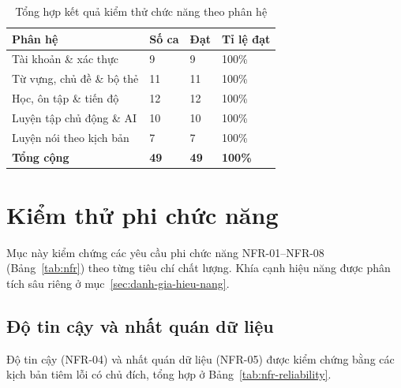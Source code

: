 \begin{table}[h]
  \centering
  \small
  \renewcommand{\arraystretch}{1.3}
  \begin{tabular}{|p{5.0cm}|p{2.4cm}|p{2.2cm}|p{3.0cm}|}
    \hline
    \textbf{Phân hệ} & \textbf{Số ca} & \textbf{Đạt} & \textbf{Tỉ lệ đạt} \\
    \hline
    Tài khoản \& xác thực & 9 & 9 & 100\% \\
    \hline
    Từ vựng, chủ đề \& bộ thẻ & 11 & 11 & 100\% \\
    \hline
    Học, ôn tập \& tiến độ & 12 & 12 & 100\% \\
    \hline
    Luyện tập chủ động \& AI & 10 & 10 & 100\% \\
    \hline
    Luyện nói theo kịch bản & 7 & 7 & 100\% \\
    \hline
    \textbf{Tổng cộng} & \textbf{49} & \textbf{49} & \textbf{100\%} \\
    \hline
  \end{tabular}
  \caption{Tổng hợp kết quả kiểm thử chức năng theo phân hệ}
  \label{tab:tc-summary}
\end{table}

\section{Kiểm thử phi chức năng}
\label{sec:kiem-thu-phi-chuc-nang}

Mục này kiểm chứng các yêu cầu phi chức năng NFR-01--NFR-08
(Bảng~\ref{tab:nfr}) theo từng tiêu chí chất lượng. Khía cạnh hiệu năng được
phân tích sâu riêng ở mục~\ref{sec:danh-gia-hieu-nang}.

\subsection{Độ tin cậy và nhất quán dữ liệu}
\label{subsec:nfr-reliability}

Độ tin cậy (NFR-04) và nhất quán dữ liệu (NFR-05) được kiểm chứng bằng các
kịch bản tiêm lỗi có chủ đích, tổng hợp ở Bảng~\ref{tab:nfr-reliability}.

